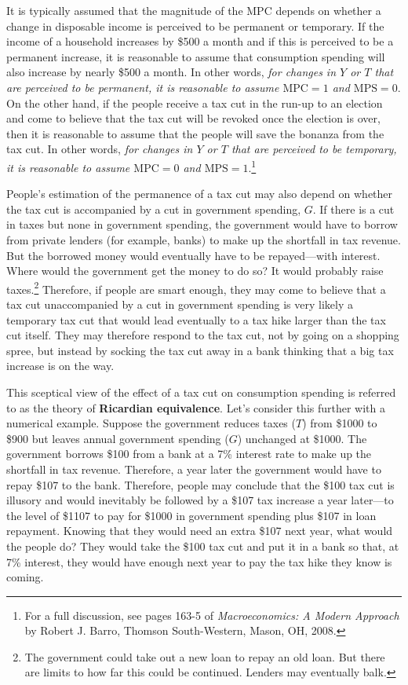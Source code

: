 \documentclass[
  letterpaper,
]{book}
\theoremstyle{plain}
\theoremstyle{remark}
\begin{document}
It is typically assumed that the magnitude of the MPC depends on whether
a change in disposable income is perceived to be permanent or temporary.
If the income of a household increases by \$500 a month and if this is
perceived to be a permanent increase, it is reasonable to assume that
consumption spending will also increase by nearly \$500 a month. In
other words, \emph{for changes in \(Y\) or \(T\) that are perceived to
be permanent, it is reasonable to assume \(\text{MPC}=1\) and
\(\text{MPS}=0\)}. On the other hand, if the people receive a tax cut in
the run-up to an election and come to believe that the tax cut will be
revoked once the election is over, then it is reasonable to assume that
the people will save the bonanza from the tax cut. In other words,
\emph{for changes in \(Y\) or \(T\) that are perceived to be temporary,
it is reasonable to assume \(\text{MPC}=0\) and
\(\text{MPS}=1\)}.\footnote{For a full discussion, see pages 163-5 of
  \emph{Macroeconomics: A Modern Approach} by Robert J. Barro, Thomson
  South-Western, Mason, OH, 2008.}

People's estimation of the permanence of a tax cut may also depend on
whether the tax cut is accompanied by a cut in government spending,
\(G\). If there is a cut in taxes but none in government spending, the
government would have to borrow from private lenders (for example,
banks) to make up the shortfall in tax revenue. But the borrowed money
would eventually have to be repayed---with interest. Where would the
government get the money to do so? It would probably raise
taxes.\footnote{The government could take out a new loan to repay an old
  loan. But there are limits to how far this could be continued. Lenders
  may eventually balk.} Therefore, if people are smart enough, they may
come to believe that a tax cut unaccompanied by a cut in government
spending is very likely a temporary tax cut that would lead eventually
to a tax hike larger than the tax cut itself. They may therefore respond
to the tax cut, not by going on a shopping spree, but instead by socking
the tax cut away in a bank thinking that a big tax increase is on the
way.

This sceptical view of the effect of a tax cut on consumption spending
is referred to as the theory of \textbf{Ricardian equivalence}. Let's
consider this further with a numerical example. Suppose the government
reduces taxes (\(T\)) from \$1000 to \$900 but leaves annual government
spending (\(G\)) unchanged at \$1000. The government borrows \$100 from
a bank at a 7\% interest rate to make up the shortfall in tax revenue.
Therefore, a year later the government would have to repay \$107 to the
bank. Therefore, people may conclude that the \$100 tax cut is illusory
and would inevitably be followed by a \$107 tax increase a year
later---to the level of \$1107 to pay for \$1000 in government spending
plus \$107 in loan repayment. Knowing that they would need an extra
\$107 next year, what would the people do? They would take the \$100 tax
cut and put it in a bank so that, at 7\% interest, they would have
enough next year to pay the tax hike they know is coming.
\end{document}

